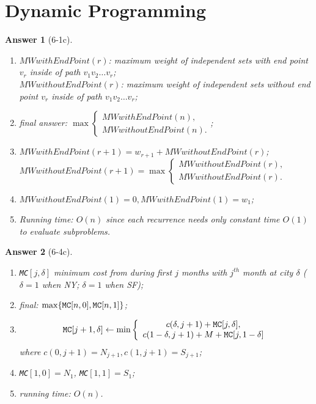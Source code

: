 \documentclass[11pt]{article}
\theoremstyle{numberplain}
\theoremstyle{nonumberplain}
\newtheorem{ans}{Answer}
\newcommand{\0}{{\mathbf{0}}}
\begin{document}
\section{Dynamic Programming}
\begin{ans}[6-1c]	
\begin{enumerate}
\item $MWwithEndPoint(r)$: maximum weight of independent sets with end point $v_r$ inside of path $v_1v_2\ldots v_r$;\\
$MWwithoutEndPoint(r)$: maximum weight of independent sets without end point $v_r$ inside of path $v_1v_2\ldots v_r$;
\item final answer: $\max\left\{
\begin{array}{c}
MWwithEndPoint(n), \\ MWwithoutEndPoint(n) .
\end{array}
\right.$;
\item $MWwithEndPoint(r+1)=w_{r+1}+MWwithoutEndPoint(r)$;\\
$MWwithoutEndPoint(r+1)=\max \left\{
\begin{array}{c}
MWwithoutEndPoint(r),\\
 MWwithoutEndPoint(r).\end{array}\right.$
\item $MWwithoutEndPoint(1)=0,MWwithEndPoint(1)=w_1$;
\item Running time: $O(n)$ since each recurrence needs only constant time $O(1)$ to evaluate subproblems.
\end{enumerate}
\end{ans}
\begin{ans}[6-4c]
\begin{enumerate}
\item {\tt MC}$[j,\delta]$ minimum cost from during first $j$ months with $j^{th}$ month at city $\delta$ ($\delta=1$ when \@ NY; $\delta=1$ when \@ SF);
\item final: $\max\{{\tt MC}[n,0], {\tt MC}[n,1] \}$;
\item $${\tt MC}[j+1,\delta]\leftarrow \min\left\{ 
\begin{array}{c}
c(\delta,j+1)+{\tt MC}[j,\delta],\\
 c(1-\delta,j+1)+M+{\tt MC}[j,1-\delta]\end{array} \right.$$ where  $c(0,j+1)=N_{j+1},c(1,j+1)=S_{j+1}$;
\item {\tt MC}$[1,0]=N_1$, {\tt MC}$[1,1]=S_1$;
\item running time: $O(n)$.
\end{enumerate}
\end{ans}
\end{document}
